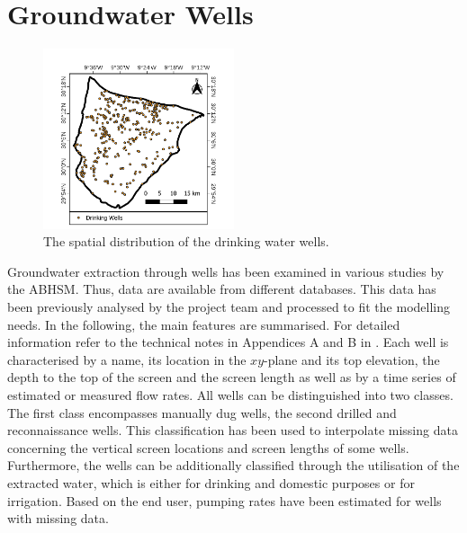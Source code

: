 
\section{Groundwater Wells}
\label{Sec-GWWells}

\begin{figure}
    \vspace{-24pt}
    \centering
    \includegraphics[width=0.5\textwidth]{./img/Map_WellsDrinking.pdf}
    \vspace{-18pt}
    \captionsetup{format=plain, textfont=it, labelfont=bf}
    \caption{The spatial distribution of the drinking water wells.}
    \vspace{-12pt}
    \label{Map-WellsDrinking}
\end{figure}

Groundwater extraction through wells has been examined in various studies by the ABHSM. 
Thus, data are available from different databases. 
This data has been previously analysed by the project team and processed to fit the modelling needs. 
In the following, the main features are summarised. 
For detailed information refer to the technical notes in Appendices A and B in \textcite{Horn.2021}. 
Each well is characterised by a name, its location in the $xy$-plane and its top elevation, the depth to the top of the screen and the screen length as well as by a time series of estimated or measured flow rates. 
All wells can be distinguished into two classes. 
The first class encompasses manually dug wells, the second drilled and reconnaissance wells. 
This classification has been used to interpolate missing data concerning the vertical screen locations and screen lengths of some wells. 
Furthermore, the wells can be additionally classified through the utilisation of the extracted water, which is either for drinking and domestic purposes or for irrigation. 
Based on the end user, pumping rates have been estimated for wells with missing data.

